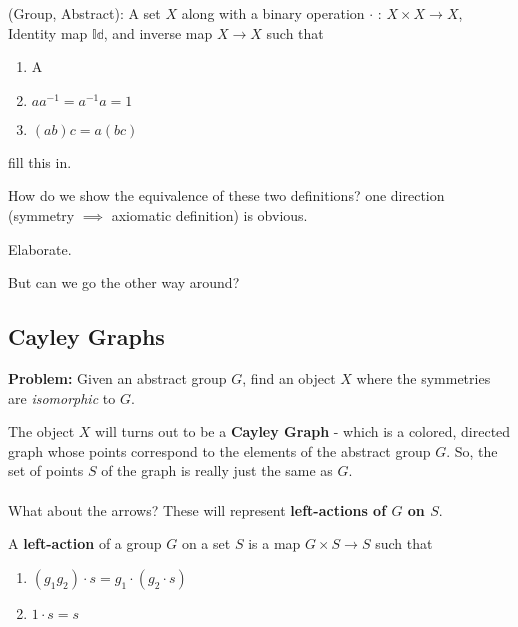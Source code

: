 \documentclass[11pt]{article}
\begin{document}
\begin{bluebox}
  \begin{definition}
    (Group, Abstract): A set $X$ along with a binary operation $\cdot \text{ : } X \times X \rightarrow X$, Identity map $\mathbb{Id}$, and inverse map $X \rightarrow X$ such that 
    \begin{enumerate}[label=(\alph*)]
      \item A
      \item $a a^{-1} = a^{-1} a = 1$
      \item $(ab)c = a(bc)$
    \end{enumerate}
    fill this in.
  \end{definition}
\end{bluebox}

How do we show the equivalence of these two definitions? one direction (symmetry $\implies$ axiomatic definition) is obvious. \begin{note}
  {Elaborate.}
\end{note} But can we go the other way around?

\subsection{Cayley Graphs}
\begin{dottedbox}
  \textbf{Problem:} Given an abstract group $G$, find an object $X$ where the symmetries are \textit{isomorphic} to $G$.
\end{dottedbox}

The object $X$ will turns out to be a \textbf{Cayley Graph} - which is a colored, directed graph whose points correspond to the elements of the abstract group $G$. So, the set of points $S$ of the graph is really just the same as $G$.
\\
\\
What about the arrows? These will represent \textbf{left-actions of $G$ on $S$}.

\begin{redbox}
  A \textbf{left-action} of a group $G$ on a set $S$ is a map $G \times S \rightarrow S$ such that 
  \begin{enumerate}[label=(\alph*)]
    \item $(g_1 g_2) \cdot s = g_1 \cdot (g_2 \cdot s)$
    \item $1 \cdot s = s$
  \end{enumerate}
\end{redbox}
\end{document}
